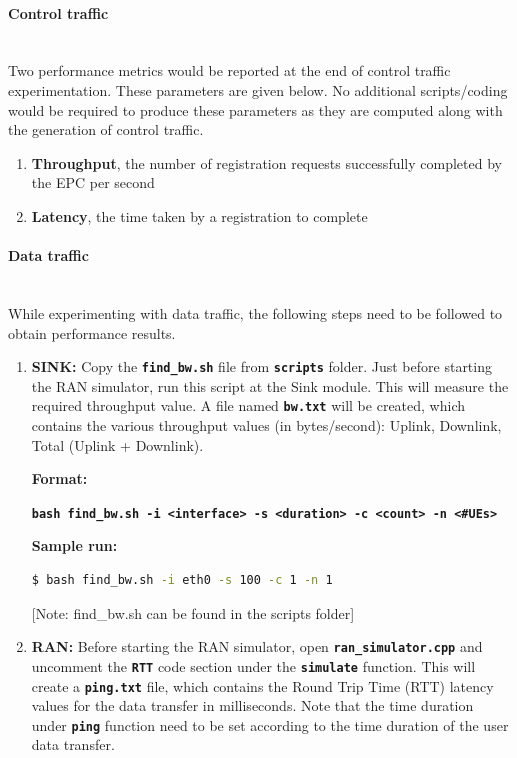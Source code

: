 \pdfminorversion=4\documentclass[hidelinks]{report}
\newcommand{\cf}[1] {
	\textbf{\texttt{#1}}
}
\begin{document}
\paragraph*{Control traffic}

~\\ Two performance metrics would be reported at the end of control traffic experimentation. These parameters are given below. No additional scripts/coding would be required to produce these parameters as they are computed along with the generation of control traffic. 

\begin{enumerate}

\item \textbf{Throughput}, the number of registration requests successfully completed by the EPC per second

\item \textbf{Latency}, the time taken by a registration to complete

\end{enumerate}

\paragraph*{Data traffic}

~\\ While experimenting with data traffic, the following steps need to be followed to obtain performance results.

\begin{enumerate}

\item \textbf{SINK:} Copy the \cf{find\_bw.sh} file from \cf{scripts} folder. Just before starting the RAN simulator, run this script at the Sink module. This will measure the required throughput value. A file named \cf{bw.txt} will be created, which contains the various throughput values (in bytes/second): Uplink, Downlink, Total (Uplink + Downlink). 

\textbf{Format:}
\begin{center}

\cf{bash find\_bw.sh -i <interface> -s <duration> -c <count> -n <\#UEs>} 

\end{center}

\textbf{Sample run:}

\begin{lstlisting}[language=bash]
$ bash find_bw.sh -i eth0 -s 100 -c 1 -n 1
\end{lstlisting}
[Note: find\_bw.sh can be found in the scripts folder]
\item \textbf{RAN:} Before starting the RAN simulator, open \cf{ran\_simulator.cpp} and uncomment the \cf{RTT} code section under the \cf{simulate} function. This will create a \cf{ping.txt} file, which contains the Round Trip Time (RTT) latency values for the data transfer in milliseconds. Note that the time duration under \cf{ping} function need to be set according to the time duration of the user data transfer.

\end{enumerate}
\end{document}
